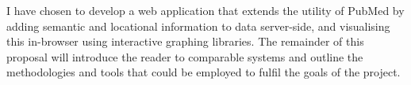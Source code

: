 \documentclass[PROP_AGutteridge_CS.tex]{subfiles}
\begin{document}
\noindent I have chosen to develop a web application that extends the utility of PubMed by adding semantic and locational information to data server-side, and visualising this in-browser using interactive graphing libraries. The remainder of this proposal will introduce the reader to comparable systems and outline the methodologies and tools that could be employed to fulfil the goals of the project.
\end{document}

